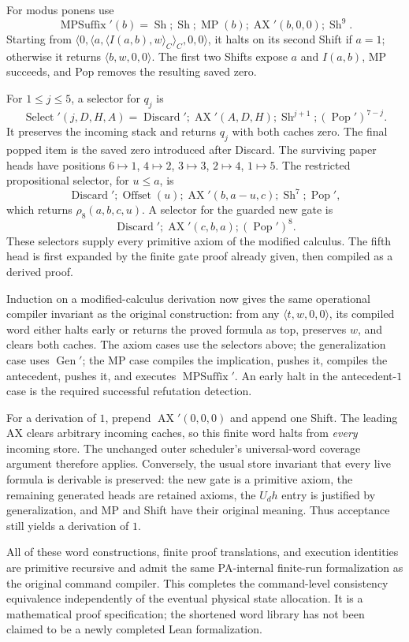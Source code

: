 For modus ponens use
\[
 \operatorname{MPSuffix}'(b)=\operatorname{Sh};\operatorname{Sh};
 \operatorname{MP}(b);\operatorname{AX}'(b,0,0);\operatorname{Sh}^{9}.
\]
Starting from
$\langle0,\langle a,\langle I(a,b),w\rangle_C\rangle_C,0,0\rangle$,
it halts on its second Shift if $a=1$; otherwise it returns
$\langle b,w,0,0\rangle$.  The first two Shifts expose $a$ and $I(a,b)$,
MP succeeds, and Pop removes the resulting saved zero.

For $1\le j\le5$, a selector for $q_j$ is
\[
 \operatorname{Select}'(j,D,H,A)=
 \operatorname{Discard}';\operatorname{AX}'(A,D,H);
 \operatorname{Sh}^{j+1};(\operatorname{Pop}')^{7-j}.
\]
It preserves the incoming stack and returns $q_j$ with both caches zero.
The final popped item is the saved zero introduced after Discard.  The
surviving paper heads have positions
$6\mapsto1$, $4\mapsto2$, $3\mapsto3$, $2\mapsto4$, $1\mapsto5$.
The restricted propositional selector, for $u\le a$, is
\[
 \operatorname{Discard}';\operatorname{Offset}(u);
 \operatorname{AX}'(b,a-u,c);\operatorname{Sh}^{7};\operatorname{Pop}',
\]
which returns $\rho_8(a,b,c,u)$.  A selector for the guarded new gate is
\[
 \operatorname{Discard}';\operatorname{AX}'(c,b,a);
 (\operatorname{Pop}')^8.
\]
These selectors supply every primitive axiom of the modified calculus.
The fifth head is first expanded by the finite gate proof already given,
then compiled as a derived proof.

Induction on a modified-calculus derivation now gives the same operational
compiler invariant as the original construction: from any
$\langle t,w,0,0\rangle$, its compiled word either halts early or returns the
proved formula as top, preserves $w$, and clears both caches.  The axiom
cases use the selectors above; the generalization case uses
$\operatorname{Gen}'$; the MP case compiles the implication, pushes it,
compiles the antecedent, pushes it, and executes
$\operatorname{MPSuffix}'$.  An early halt in the antecedent-$1$ case is the
required successful refutation detection.

For a derivation of $1$, prepend $\operatorname{AX}'(0,0,0)$ and append one
Shift.  The leading AX clears arbitrary incoming caches, so this finite word
halts from \emph{every} incoming store.  The unchanged outer scheduler's
universal-word coverage argument therefore applies.  Conversely, the usual
store invariant that every live formula is derivable is preserved: the new
gate is a primitive axiom, the remaining generated heads are retained axioms,
the $U_dh$ entry is justified by generalization, and MP and Shift have their
original meaning.  Thus acceptance still yields a derivation of $1$.

All of these word constructions, finite proof translations, and execution
identities are primitive recursive and admit the same PA-internal finite-run
formalization as the original command compiler.  This completes the
command-level consistency equivalence independently of the eventual physical
state allocation.  It is a mathematical proof specification; the shortened
word library has not been claimed to be a newly completed Lean formalization.
